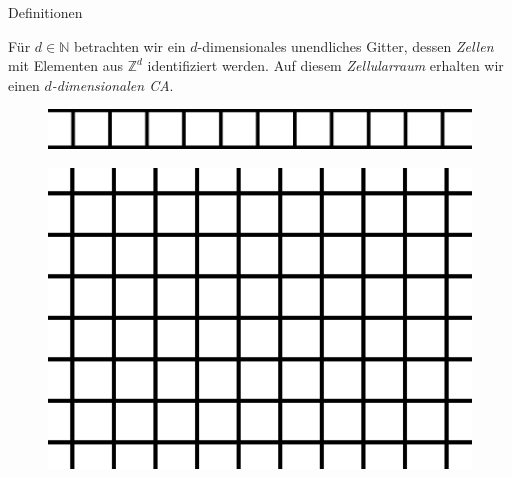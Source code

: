 \documentclass[aspectratio=169]{beamer}
\begin{document}
  \begin{frame}{Definitionen}
    \begin{definition*}[Zellularraum]
      Für $d \in \mathbb{N}$ betrachten wir ein $d$-dimensionales unendliches Gitter, dessen \textit{Zellen} mit Elementen aus $\mathbb{Z}^d$ identifiziert werden. Auf diesem \textit{Zellularraum} erhalten wir einen \textit{$d$-dimensionalen CA}.
    \end{definition*}

    \begin{multicols*}{3}
      \begin{figure}[H]
          \centering
          \includegraphics[width = 0.4 \textheight]{1d_cellspace.png}
      \end{figure}
      \vfill\null
      \columnbreak

      \pause

      \begin{figure}[H]
          \centering
          \includegraphics[width = 0.35 \textheight]{2d_cellspace.png}
      \end{figure}
      \vfill\null
      \columnbreak

      \pause


\end{multicols*}
\end{frame}
\end{document}
